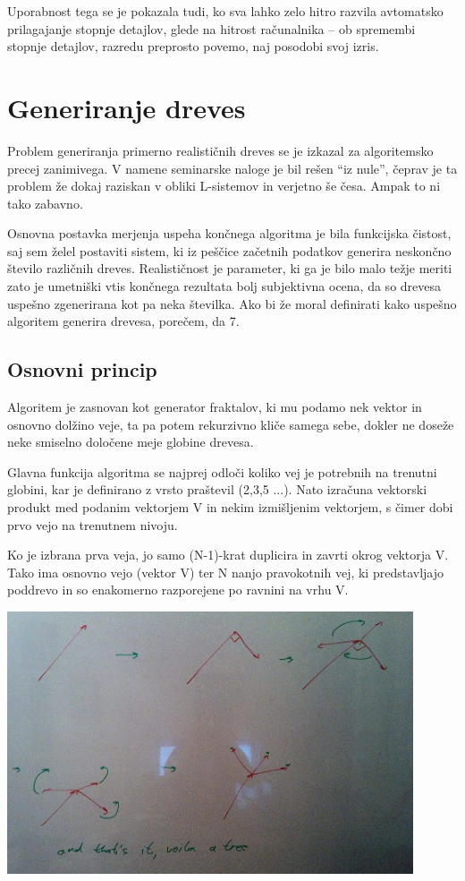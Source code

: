 \documentclass[10pt,a4paper,oneside]{book}
\begin{document}
Uporabnost tega se je pokazala tudi, ko sva lahko zelo hitro razvila avtomatsko prilagajanje stopnje detajlov, glede na hitrost računalnika -- ob spremembi stopnje detajlov, razredu preprosto povemo, naj posodobi svoj izris.

\section{Generiranje dreves}
Problem generiranja primerno realističnih dreves se je izkazal za
algoritemsko precej zanimivega. V namene seminarske naloge je bil
rešen ``iz nule'', čeprav je ta problem že dokaj raziskan v obliki
L-sistemov in verjetno še česa. Ampak to ni tako zabavno.

Osnovna postavka merjenja uspeha končnega algoritma je bila funkcijska
čistost, saj sem želel postaviti sistem, ki iz peščice začetnih
podatkov generira neskončno število različnih dreves. Realističnost je
parameter, ki ga je bilo malo težje meriti zato je umetniški vtis
končnega rezultata bolj subjektivna ocena, da so drevesa uspešno
zgenerirana kot pa neka številka. Ako bi že moral definirati kako
uspešno algoritem generira drevesa, porečem, da 7.

\subsection{Osnovni princip}
Algoritem je zasnovan kot generator fraktalov, ki mu podamo nek vektor
in osnovno dolžino veje, ta pa potem rekurzivno kliče samega sebe,
dokler ne doseže neke smiselno določene meje globine drevesa.

Glavna funkcija algoritma se najprej odloči koliko vej je potrebnih na
trenutni globini, kar je definirano z vrsto praštevil (2,3,5
...). Nato izračuna vektorski produkt med podanim vektorjem V in nekim
izmišljenim vektorjem, s čimer dobi prvo vejo na trenutnem nivoju.

Ko je izbrana prva veja, jo samo (N-1)-krat duplicira in zavrti okrog
vektorja V. Tako ima osnovno vejo (vektor V) ter N nanjo pravokotnih
vej, ki predstavljajo poddrevo in so enakomerno razporejene po ravnini
na vrhu V.

\includegraphics[width=12cm]{algorithmsketch.jpg}
\end{document}

